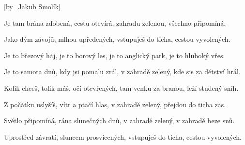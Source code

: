 [by={Jakub Smolík}]

\beginverse{}
Je tam brána zdobená, cestu otevírá,
zahradu zelenou, všechno připomíná.
\endverse{}

\beginverse{}
Jako dým závojů, mlhou upředených,
vstupuješ do ticha, cestou vyvolených.
\endverse{}

\beginverse{}
Je to březový háj, je to borový les,
je to anglický park, je to hluboký vřes.
\endverse{}

\beginverse{}
Je to samota dnů, kdy jsi pomalu zrál,
v zahradě zelený, kde sis za dětství hrál.
\endverse{}

\beginverse{}
Kolik chceš, tolik máš, očí otevřených,
tam venku za branou, leží studený sníh.
\endverse{}

\beginverse{}
Z počátku uslyšíš, vítr a ptačí hlas,
v zahradě zelený, přejdou do ticha zas.
\endverse{}

\beginverse{}
Světlo připomíná, rána slunečných dnů,
v zahradě zelený, v zahradě beze snů.
\endverse{}

\beginverse{}
Uprostřed závratí, sluncem prosvícených,
vstupuješ do ticha, cestou vyvolených.
\endverse{}

\endsong{}
